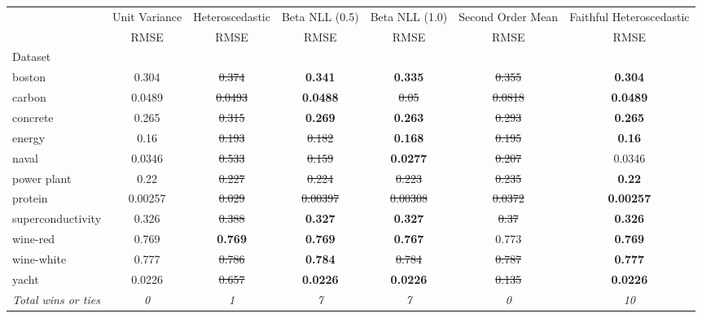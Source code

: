 \begin{tabular}{l|c|c|c|c|c|c}
\toprule
{} & {Unit Variance} & {Heteroscedastic} & {Beta NLL (0.5)} & {Beta NLL (1.0)} & {Second Order Mean} & {Faithful Heteroscedastic} \\
{} & {RMSE} & {RMSE} & {RMSE} & {RMSE} & {RMSE} & {RMSE} \\
{Dataset} & {} & {} & {} & {} & {} & {} \\
\midrule
boston & 0.304 & \sout{0.374} & \textbf{0.341} & \textbf{0.335} & \sout{0.355} & \textbf{0.304} \\
carbon & 0.0489 & \sout{0.0493} & \textbf{0.0488} & \sout{0.05} & \sout{0.0818} & \textbf{0.0489} \\
concrete & 0.265 & \sout{0.315} & \textbf{0.269} & \textbf{0.263} & \sout{0.293} & \textbf{0.265} \\
energy & 0.16 & \sout{0.193} & \sout{0.182} & \textbf{0.168} & \sout{0.195} & \textbf{0.16} \\
naval & 0.0346 & \sout{0.533} & \sout{0.159} & \textbf{0.0277} & \sout{0.207} & 0.0346 \\
power plant & 0.22 & \sout{0.227} & \sout{0.224} & \sout{0.223} & \sout{0.235} & \textbf{0.22} \\
protein & 0.00257 & \sout{0.029} & \sout{0.00397} & \sout{0.00308} & \sout{0.0372} & \textbf{0.00257} \\
superconductivity & 0.326 & \sout{0.388} & \textbf{0.327} & \textbf{0.327} & \sout{0.37} & \textbf{0.326} \\
wine-red & 0.769 & \textbf{0.769} & \textbf{0.769} & \textbf{0.767} & 0.773 & \textbf{0.769} \\
wine-white & 0.777 & \sout{0.786} & \textbf{0.784} & \sout{0.784} & \sout{0.787} & \textbf{0.777} \\
yacht & 0.0226 & \sout{0.657} & \textbf{0.0226} & \textbf{0.0226} & \sout{0.135} & \textbf{0.0226} \\
\textit{{Total wins or ties}} & \textit{0} & \textit{1} & \textit{7} & \textit{7} & \textit{0} & \textit{10} \\
\bottomrule
\end{tabular}
